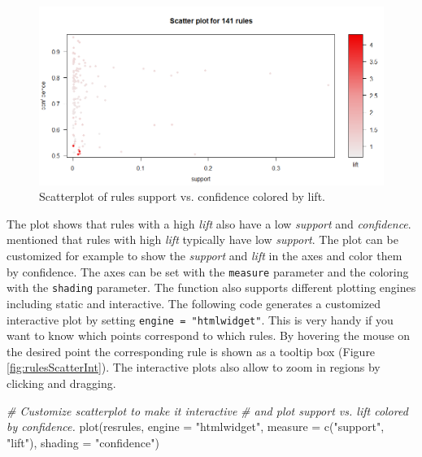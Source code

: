 \documentclass[
  11pt,
]{krantz}
\newenvironment{Shaded}{\begin{snugshade}}{\end{snugshade}}
\newcommand{\AttributeTok}[1]{\textcolor[rgb]{0.61,0.61,0.61}{#1}}
\newcommand{\CommentTok}[1]{\textcolor[rgb]{0.37,0.37,0.37}{\textit{#1}}}
\newcommand{\FunctionTok}[1]{\textcolor[rgb]{0,0,0}{#1}}
\newcommand{\NormalTok}[1]{#1}
\newcommand{\StringTok}[1]{\textcolor[rgb]{0.5,0.5,0.5}{#1}}
\begin{document}
\begin{figure}

{\centering \includegraphics[width=0.9\linewidth]{images/rules_scatter} 

}

\caption{Scatterplot of rules support vs. confidence colored by lift.}\label{fig:rulesScatter}
\end{figure}

The plot shows that rules with a high \emph{lift} also have a low \emph{support} and \emph{confidence}. \citet{Hahsler2017} mentioned that rules with high \emph{lift} typically have low \emph{support}. The plot can be customized for example to show the \emph{support} and \emph{lift} in the axes and color them by confidence. The axes can be set with the \texttt{measure} parameter and the coloring with the \texttt{shading} parameter. The function also supports different plotting engines including static and interactive. The following code generates a customized interactive plot by setting \texttt{engine\ =\ "htmlwidget"}. This is very handy if you want to know which points correspond to which rules. By hovering the mouse on the desired point the corresponding rule is shown as a tooltip box (Figure \ref{fig:rulesScatterInt}). The interactive plots also allow to zoom in regions by clicking and dragging.

\begin{Shaded}
\begin{Highlighting}[]
\CommentTok{\# Customize scatterplot to make it interactive}
\CommentTok{\# and plot support vs. lift colored by confidence.}
\FunctionTok{plot}\NormalTok{(resrules, }\AttributeTok{engine =} \StringTok{"htmlwidget"}\NormalTok{,}
     \AttributeTok{measure =} \FunctionTok{c}\NormalTok{(}\StringTok{"support"}\NormalTok{, }\StringTok{"lift"}\NormalTok{), }\AttributeTok{shading =} \StringTok{"confidence"}\NormalTok{)}
\end{Highlighting}
\end{Shaded}
\end{document}
